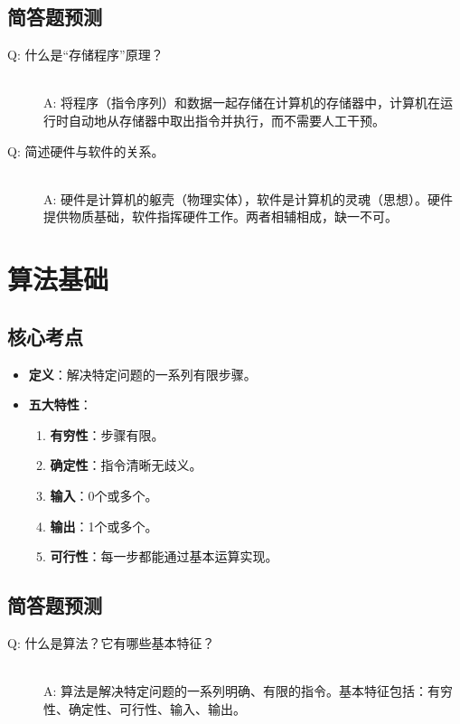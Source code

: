 \documentclass[a4paper,12pt]{article}
\begin{document}
\subsection{简答题预测}
\begin{description}
    \item[Q: 什么是“存储程序”原理？] \hfill \\
    A: 将程序（指令序列）和数据一起存储在计算机的存储器中，计算机在运行时自动地从存储器中取出指令并执行，而不需要人工干预。
    \item[Q: 简述硬件与软件的关系。] \hfill \\
    A: 硬件是计算机的躯壳（物理实体），软件是计算机的灵魂（思想）。硬件提供物质基础，软件指挥硬件工作。两者相辅相成，缺一不可。
\end{description}

\section{算法基础}

\subsection{核心考点}
\begin{itemize}
    \item \textbf{定义}：解决特定问题的一系列有限步骤。
    \item \textbf{五大特性}：
    \begin{enumerate}
        \item \textbf{有穷性}：步骤有限。
        \item \textbf{确定性}：指令清晰无歧义。
        \item \textbf{输入}：0个或多个。
        \item \textbf{输出}：1个或多个。
        \item \textbf{可行性}：每一步都能通过基本运算实现。
    \end{enumerate}
\end{itemize}

\subsection{简答题预测}
\begin{description}
    \item[Q: 什么是算法？它有哪些基本特征？] \hfill \\
    A: 算法是解决特定问题的一系列明确、有限的指令。基本特征包括：有穷性、确定性、可行性、输入、输出。
\end{description}
\end{document}
